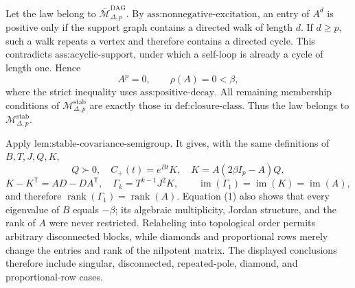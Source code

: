 Let the law belong to \(\overline{\mathcal M}_{\Delta,p}^{\mathrm{DAG}}\).  By \(\text{ass:nonnegative-excitation}\), an entry of \(A^d\) is positive only if the support graph contains a directed walk of length \(d\).  If \(d\geq p\), such a walk repeats a vertex and therefore contains a directed cycle.  This contradicts \(\text{ass:acyclic-support}\), under which a self-loop is already a cycle of length one.  Hence
\[
 A^p=0,\qquad \rho(A)=0<\beta,
\tag{1}
\]
where the strict inequality uses \(\text{ass:positive-decay}\).  All remaining membership conditions of \(\mathcal M_{\Delta,p}^{\mathrm{stab}}\) are exactly those in \(\text{def:closure-class}\).  Thus the law belongs to \(\mathcal M_{\Delta,p}^{\mathrm{stab}}\).

Apply \(\text{lem:stable-covariance-semigroup}\).  It gives, with the same definitions of \(B,T,J,Q,K\),
\[
 Q\succ0,\quad C_+(t)=e^{Bt}K,\quad K=A(2\beta I_p-A)Q,
\]
\[
 K-K^{\mathsf T}=AD-DA^{\mathsf T},\quad
 \Gamma_k=T^{k-1}J^2K,\qquad
 \operatorname{im}(\Gamma_1)=\operatorname{im}(K)=\operatorname{im}(A),
\]
and therefore \(\operatorname{rank}(\Gamma_1)=\operatorname{rank}(A)\).  Equation (1) also shows that every eigenvalue of \(B\) equals \(-\beta\); its algebraic multiplicity, Jordan structure, and the rank of \(A\) were never restricted.  Relabeling into topological order permits arbitrary disconnected blocks, while diamonds and proportional rows merely change the entries and rank of the nilpotent matrix.  The displayed conclusions therefore include singular, disconnected, repeated-pole, diamond, and proportional-row cases.